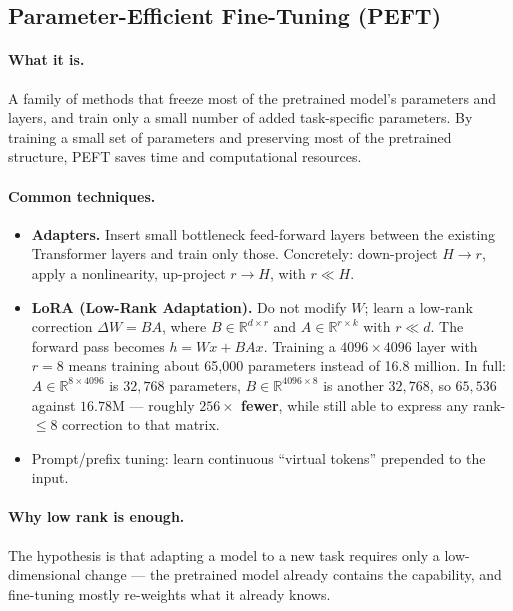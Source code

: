 \documentclass[11pt,a4paper]{article}
\begin{document}
\subsection{Parameter-Efficient Fine-Tuning (PEFT)}

\paragraph{What it is.} A family of methods that freeze most of the pretrained model's
parameters and layers, and train only a small number of added task-specific parameters. By
training a small set of parameters and preserving most of the pretrained structure, PEFT saves
time and computational resources.

\paragraph{Common techniques.}
\begin{itemize}
\item \textbf{Adapters.} Insert small bottleneck feed-forward layers between the existing
  Transformer layers and train only those. Concretely: down-project $H \rightarrow r$, apply a
  nonlinearity, up-project $r \rightarrow H$, with $r \ll H$.
\item \textbf{LoRA (Low-Rank Adaptation).} Do not modify $W$; learn a low-rank correction
  $\Delta W = BA$, where $B \in \mathbb{R}^{d \times r}$ and $A \in \mathbb{R}^{r \times k}$
  with $r \ll d$. The forward pass becomes $h = Wx + BAx$. Training a $4096 \times 4096$ layer
  with $r = 8$ means training about 65{,}000 parameters instead of 16.8 million. In full:
  $A \in \mathbb{R}^{8 \times 4096}$ is $32{,}768$ parameters, $B \in \mathbb{R}^{4096 \times 8}$
  is another $32{,}768$, so $65{,}536$ against $16.78$M --- roughly \textbf{$256\times$ fewer},
  while still able to express any rank-$\le 8$ correction to that matrix.
\item Prompt/prefix tuning: learn continuous ``virtual tokens'' prepended to the input.
\end{itemize}

\paragraph{Why low rank is enough.} The hypothesis is that adapting a model to a new task
requires only a low-dimensional change --- the pretrained model already contains the
capability, and fine-tuning mostly re-weights what it already knows.
\end{document}
